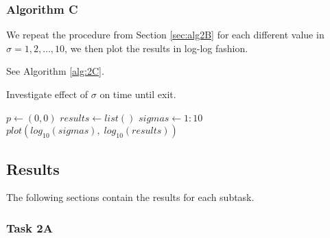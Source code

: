 \subsubsection{Algorithm C}
\label{sec:alg2C}



We repeat the procedure from Section \ref{sec:alg2B} for each different value in $\sigma = 1, 2, \dots, 10$, we then plot the results in log-log fashion.

See Algorithm \ref{alg:2C}.

\begin{algorithm}[H]
    \label{alg:2C}
    \caption{Investigate effect of $\sigma$ on time until exit.}
    $p \gets (0,0)$ \;
    $results \gets list()$ 
    $sigmas \gets 1:10$
    $plot(log_{10}(sigmas),\; log_{10}(results))$
\end{algorithm}

\subsection{Results}
\label{sec:res2}


The following sections contain the results for each subtask.

\subsubsection{Task 2A}
\label{sec:res2A}


